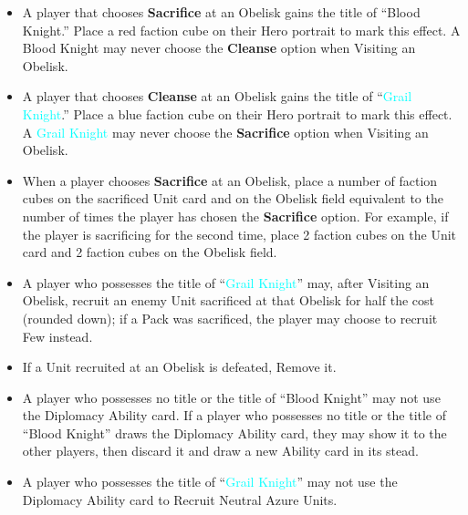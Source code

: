 \begin{multicols*}{2}
\begin{itemize}
\begin{enumerate}[leftmargin=15pt]
\begin{enumerate}
            \item *: Gain 18 , 9 , and 3 . Additionally, \textbf{Search (2)} the Relic card deck. Finally, if the Unit card was on the Pack side, \textbf{Search (2)} the  Unit deck; you may Recruit one of these Units for half the cost (rounded down).
        \end{enumerate}
    \end{enumerate}
    \item A player that chooses \textbf{Sacrifice} at an Obelisk gains the title of “\textcolor{darkcandyapplered}{Blood Knight}.” Place a red faction cube on their Hero portrait to mark this effect. A \textcolor{darkcandyapplered}{Blood Knight} may never choose the \textbf{Cleanse} option when Visiting an Obelisk.
    \item A player that chooses \textbf{Cleanse} at an Obelisk gains the title of “\textcolor{cyan}{Grail Knight}.” Place a blue faction cube on their Hero portrait to mark this effect. A \textcolor{cyan}{Grail Knight} may never choose the \textbf{Sacrifice} option when Visiting an Obelisk.
    \item When a player chooses \textbf{Sacrifice} at an Obelisk, place a number of faction cubes on the sacrificed Unit card and on the Obelisk field equivalent to the number of times the player has chosen the \textbf{Sacrifice} option. For example, if the player is sacrificing for the second time, place 2 faction cubes on the Unit card and 2 faction cubes on the Obelisk field.
    \item A player who possesses the title of “\textcolor{cyan}{Grail Knight}” may, after Visiting an Obelisk, recruit an enemy Unit sacrificed at that Obelisk for half the cost (rounded down); if a Pack was sacrificed, the player may choose to recruit Few instead.
    \item If a Unit recruited at an Obelisk is defeated, Remove it.
    \item A player who possesses no title or the title of “\textcolor{darkcandyapplered}{Blood Knight}” may not use the Diplomacy Ability card. If a player who possesses no title or the title of “\textcolor{darkcandyapplered}{Blood Knight}” draws the Diplomacy Ability card, they may show it to the other players, then discard it and draw a new Ability card in its stead.
    \item A player who possesses the title of “\textcolor{cyan}{Grail Knight}” may not use the Diplomacy Ability card to Recruit Neutral Azure Units.

\end{itemize}
\end{multicols*}
